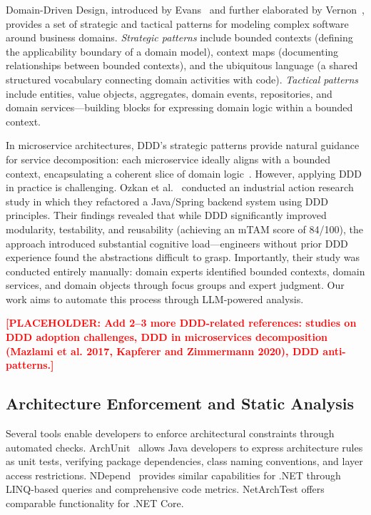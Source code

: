 \documentclass[smallextended]{svjour3}
\newcommand{\placeholder}[1]{\textcolor{red}{\textbf{[PLACEHOLDER: #1]}}}
\begin{document}
Domain-Driven Design, introduced by Evans~\cite{evans2003ddd} and further elaborated by Vernon~\cite{vernon2013implementing}, provides a set of strategic and tactical patterns for modeling complex software around business domains.
\emph{Strategic patterns} include bounded contexts (defining the applicability boundary of a domain model), context maps (documenting relationships between bounded contexts), and the ubiquitous language (a shared structured vocabulary connecting domain activities with code).
\emph{Tactical patterns} include entities, value objects, aggregates, domain events, repositories, and domain services---building blocks for expressing domain logic within a bounded context.

In microservice architectures, DDD's strategic patterns provide natural guidance for service decomposition: each microservice ideally aligns with a bounded context, encapsulating a coherent slice of domain logic~\cite{microsoft2024tactical}.
However, applying DDD in practice is challenging.
Ozkan et al.~\cite{ozkan2023refactoring} conducted an industrial action research study in which they refactored a Java/Spring backend system using DDD principles.
Their findings revealed that while DDD significantly improved modularity, testability, and reusability (achieving an mTAM score of 84/100), the approach introduced substantial cognitive load---engineers without prior DDD experience found the abstractions difficult to grasp.
Importantly, their study was conducted entirely manually: domain experts identified bounded contexts, domain services, and domain objects through focus groups and expert judgment.
Our work aims to automate this process through LLM-powered analysis.

\placeholder{Add 2--3 more DDD-related references: studies on DDD adoption challenges, DDD in microservices decomposition (Mazlami et al. 2017, Kapferer and Zimmermann 2020), DDD anti-patterns.}

\subsection{Architecture Enforcement and Static Analysis}
\label{sec:bg_enforcement}

Several tools enable developers to enforce architectural constraints through automated checks.
ArchUnit~\cite{archunit2024} allows Java developers to express architecture rules as unit tests, verifying package dependencies, class naming conventions, and layer access restrictions.
NDepend~\cite{ndepend2024} provides similar capabilities for .NET through LINQ-based queries and comprehensive code metrics.
NetArchTest offers comparable functionality for .NET Core.
\end{document}
